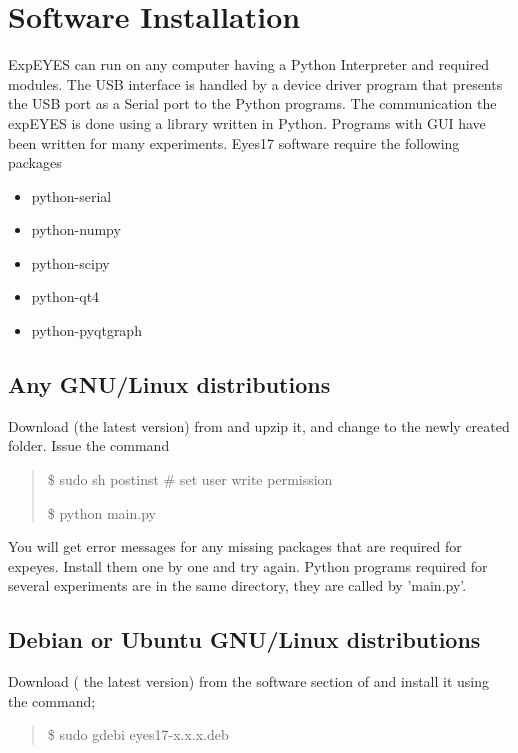 \documentclass[a4paper,12pt,english]{sphinxmanual}
\begin{document}
\chapter{Software Installation}
\label{\detokenize{1.3:software-installation}}\label{\detokenize{1.3::doc}}
ExpEYES can run on any computer having a Python Interpreter and required
modules. The USB interface is handled by a device driver program that
presents the USB port as a Serial port to the Python programs. The
communication the expEYES is done using a library written in Python.
Programs with GUI have been written for many experiments. Eyes17
software require the following packages
\begin{itemize}
\item {} 
python-serial

\item {} 
python-numpy

\item {} 
python-scipy

\item {} 
python-qt4

\item {} 
python-pyqtgraph

\end{itemize}


\section{Any GNU/Linux distributions}
\label{\detokenize{1.3:any-gnu-linux-distributions}}
Download  (the latest version) from
 and upzip it, and change to the newly created
folder. Issue the command
\begin{quote}

\$ sudo sh postinst       \# set user write permission

\$ python main.py
\end{quote}

You will get error messages for any missing packages that are required
for expeyes. Install them one by one and try again. Python programs
required for several experiments are in the same directory, they are
called by ’main.py’.


\section{Debian or Ubuntu GNU/Linux distributions}
\label{\detokenize{1.3:debian-or-ubuntu-gnu-linux-distributions}}
Download  ( the latest version) from the software
section of  and install it using the command;
\begin{quote}

\$ sudo gdebi eyes17-x.x.x.deb
\end{quote}
\end{document}
